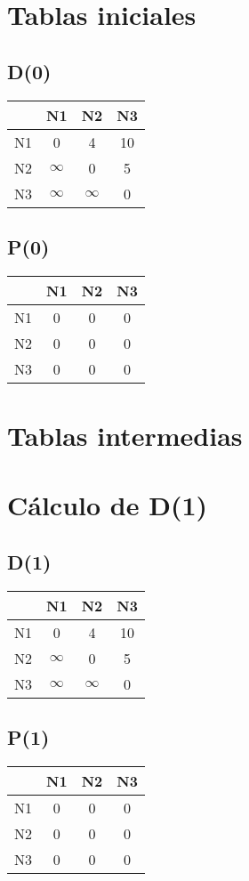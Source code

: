 \documentclass[a4paper,11pt]{article}
\begin{document}
\section*{Tablas iniciales}
\subsection*{D(0)}
\begin{center}
\begin{tabular}{c|ccc}
 & N1 & N2 & N3 \\ \hline
N1 & 0 & 4 & 10 \\
N2 & $\infty$ & 0 & 5 \\
N3 & $\infty$ & $\infty$ & 0 \\
\end{tabular}
\end{center}
\subsection*{P(0)}
\begin{center}
\begin{tabular}{c|ccc}
 & N1 & N2 & N3 \\ \hline
N1 & 0 & 0 & 0 \\
N2 & 0 & 0 & 0 \\
N3 & 0 & 0 & 0 \\
\end{tabular}
\end{center}
\newpage
\section*{Tablas intermedias}
\section*{Cálculo de D(1)}
\subsection*{D(1)}
\begin{center}
\begin{tabular}{c|ccc}
 & N1 & N2 & N3 \\ \hline
N1 & 0 & 4 & 10 \\
N2 & $\infty$ & 0 & 5 \\
N3 & $\infty$ & $\infty$ & 0 \\
\end{tabular}
\end{center}
\subsection*{P(1)}
\begin{center}
\begin{tabular}{c|ccc}
 & N1 & N2 & N3 \\ \hline
N1 & 0 & 0 & 0 \\
N2 & 0 & 0 & 0 \\
N3 & 0 & 0 & 0 \\
\end{tabular}
\end{center}
\newpage
\end{document}
